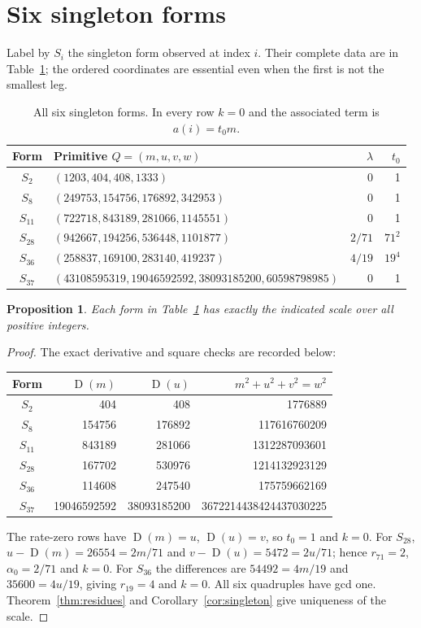 \documentclass[11pt]{article}
\newcommand{\D}{\operatorname{D}}
\newtheorem{proposition}[theorem]{Proposition}
\theoremstyle{definition}
\begin{document}
\section{Six singleton forms}\label{sec:singletons}
Label by $S_i$ the singleton form observed at index $i$. Their complete
data are in Table~\ref{tab:singletons}; the ordered coordinates are
essential even when the first is not the smallest leg.

\begin{table}[ht]
\centering\scriptsize
\begin{tabular}{clrr}
\toprule
Form & Primitive $Q=(m,u,v,w)$ & $\lambda$ & $t_0$\\
\midrule
$S_2$ & $(1203,404,408,1333)$ & 0 & 1\\
$S_8$ & $(249753,154756,176892,342953)$ & 0 & 1\\
$S_{11}$ & $(722718,843189,281066,1145551)$ & 0 & 1\\
$S_{28}$ & $(942667,194256,536448,1101877)$ & $2/71$ & $71^2$\\
$S_{36}$ & $(258837,169100,283140,419237)$ & $4/19$ & $19^4$\\
$S_{37}$ & $(43108595319,19046592592,38093185200,60598798985)$ & 0 & 1\\
\bottomrule
\end{tabular}
\caption{All six singleton forms. In every row $k=0$ and the associated
term is $a(i)=t_0m$.}\label{tab:singletons}
\end{table}

\begin{proposition}\label{prop:singletons}
Each form in Table~\ref{tab:singletons} has exactly the indicated scale
over all positive integers.
\end{proposition}
\begin{proof}
The exact derivative and square checks are recorded below:
\begin{center}\small
\begin{tabular}{crrr}
\toprule
Form & $\D(m)$ & $\D(u)$ & $m^2+u^2+v^2=w^2$\\
\midrule
$S_2$ & 404 & 408 & 1776889\\
$S_8$ & 154756 & 176892 & 117616760209\\
$S_{11}$ & 843189 & 281066 & 1312287093601\\
$S_{28}$ & 167702 & 530976 & 1214132923129\\
$S_{36}$ & 114608 & 247540 & 175759662169\\
$S_{37}$ & 19046592592 & 38093185200 & 3672214438424437030225\\
\bottomrule
\end{tabular}
\end{center}
The rate-zero rows have $\D(m)=u$, $\D(u)=v$, so $t_0=1$ and
$k=0$. For $S_{28}$,
$u-\D(m)=26554=2m/71$ and
$v-\D(u)=5472=2u/71$; hence $r_{71}=2$, $\alpha_0=2/71$
and $k=0$. For $S_{36}$ the differences are
$54492=4m/19$ and $35600=4u/19$, giving $r_{19}=4$ and $k=0$.
All six quadruples have gcd one. Theorem~\ref{thm:residues} and
Corollary~\ref{cor:singleton} give uniqueness of the scale.
\end{proof}
\end{document}
